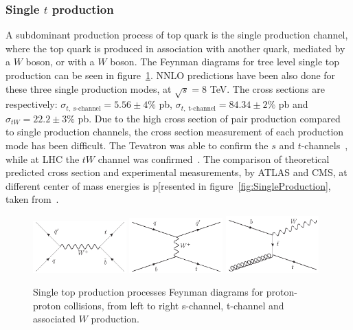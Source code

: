 
\subsubsection{Single $t$ production}
\label{subsec:topsing}

A subdominant production process of top quark is the single production channel, where the top quark is produced in association with another quark, mediated by a $W$ boson, or with a $W$ boson. The Feynman diagrams for tree level single top production can be seen in figure~\ref{fig:SingleProductionFD}. NNLO predictions have been also done for these three single production modes, at $\sqrt{s}=8$ TeV. The cross sections are respectively: $\sigma_{t,\; \text{s-channel}}=5.56\pm4\%$ pb, $\sigma_{t,\; \text{t-channel}}=84.34\pm2\%$ pb and $\sigma_{tW}=22.2\pm3\%$ pb. Due to the high cross section of pair production compared to single production channels, the cross section measurement of each production mode has been difficult. The Tevatron was able to confirm the $s$ and $t$-channels~\cite{Aaltonen:2009jj}, while at LHC the $tW$ channel was confirmed~\cite{Chatrchyan:1642680}. The comparison of theoretical predicted cross section and experimental measurements, by ATLAS and CMS, at different center of mass energies is p[resented in figure~\ref{fig:SingleProduction}, taken from~\cite{TOPLHCWG}.

\begin{figure}[!Hhtbp]
  \begin{center}
    \includegraphics[width=0.32\textwidth]{figs/Schannel_top_single.jpg}
    \includegraphics[width=0.32\textwidth]{figs/Tchannel_top_single.jpg}
    \includegraphics[width=0.32\textwidth]{figs/TWchannel_top_single.jpg}
    \caption{Single top production processes Feynman diagrams for proton-proton collisions, from left to right s-channel, t-channel and associated $W$ production.}
    \label{fig:SingleProductionFD}
  \end{center}
\end{figure}

